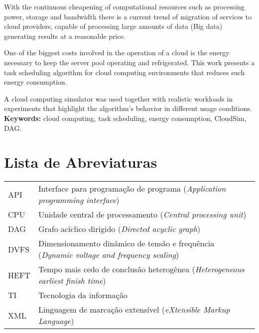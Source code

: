\documentclass[11pt,twoside,a4paper]{book}
\begin{document}
With the continuous cheapening of computational resources such as processing
power, storage and bandwidth there is a current trend of migration of services
to cloud providers, capable of processing large amounts of data (Big data) 
generating results at a reasonable price.

One of the biggest costs involved in the operation of a cloud is the energy
necessary to keep the server pool operating and refrigerated. This work
presents a task scheduling algorithm for cloud computing
environments that reduces such energy consumption.

A cloud computing simulator was used together with realistic workloads in
experiments that highlight the algorithm's behavior in different
usage conditions.\\

\noindent \textbf{Keywords:} cloud computing, task scheduling, energy
consumption, CloudSim, DAG.

\newpage
\thispagestyle{empty}
\null
\vfill
{}
\tableofcontents    %

\chapter{Lista de Abreviaturas}
\begin{tabular}{ll}
         API         & Interface para programação de programa (\emph{Application programming interface})\\
         CPU         & Unidade central de processamento (\emph{Central processing unit})\\
         DAG         & Grafo acíclico dirigido (\emph{Directed acyclic graph})\\
        DVFS         & Dimensionamento dinâmico de tensão e frequência (\emph{Dynamic voltage and frequency scaling})\\
        HEFT         & Tempo mais cedo de conclusão heterogênea (\emph{Heterogeneous earliest finish time})\\
          TI         & Tecnologia da informação\\
         XML         & Linguagem de marcação extensível (\emph{eXtensible Markup Language})\\
\end{tabular}
\end{document}
